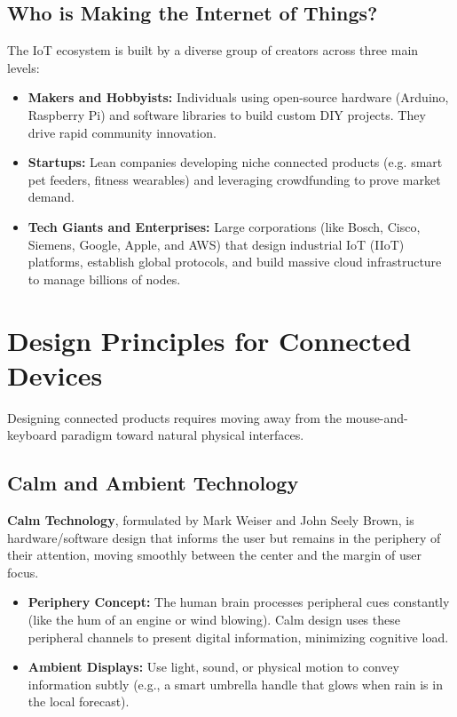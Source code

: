 \documentclass[12pt,a4paper]{article}
\begin{document}
\subsection{Who is Making the Internet of Things?}
The IoT ecosystem is built by a diverse group of creators across three main levels:
\begin{itemize}[leftmargin=*, itemsep=3.0pt]
  \item \textbf{Makers and Hobbyists:} Individuals using open-source hardware (Arduino, Raspberry Pi) and software libraries to build custom DIY projects. They drive rapid community innovation.
  \item \textbf{Startups:} Lean companies developing niche connected products (e.g. smart pet feeders, fitness wearables) and leveraging crowdfunding to prove market demand.
  \item \textbf{Tech Giants and Enterprises:} Large corporations (like Bosch, Cisco, Siemens, Google, Apple, and AWS) that design industrial IoT (IIoT) platforms, establish global protocols, and build massive cloud infrastructure to manage billions of nodes.
\end{itemize}


\section{Design Principles for Connected Devices}

Designing connected products requires moving away from the mouse-and-keyboard paradigm toward natural physical interfaces.

\subsection{Calm and Ambient Technology}
\begin{tcolorbox}[defbox, title={Calm Technology}]
  \textbf{Calm Technology}, formulated by Mark Weiser and John Seely Brown, is hardware/software design that informs the user but remains in the periphery of their attention, moving smoothly between the center and the margin of user focus.
\end{tcolorbox}
\begin{itemize}[leftmargin=*, itemsep=2.5pt]
  \item \textbf{Periphery Concept:} The human brain processes peripheral cues constantly (like the hum of an engine or wind blowing). Calm design uses these peripheral channels to present digital information, minimizing cognitive load.
  \item \textbf{Ambient Displays:} Use light, sound, or physical motion to convey information subtly (e.g., a smart umbrella handle that glows when rain is in the local forecast).
\end{itemize}
\end{document}
